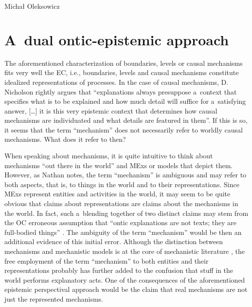 \begin{artengenv}{Michał Oleksowicz}
\section{A~dual ontic-epistemic approach }
The aforementioned characterization of boundaries, levels or causal mechanisms fits very well the EC, i.e., boundaries, levels and causal mechanisms constitute idealized representations of processes. In the case of causal mechanisms, D. Nicholson
\parencite*[][p.160]{nicholson_concept_2012} %
 rightly argues that ``explanations always presuppose a~context that specifies what is to be explained and how much detail will suffice for a~satisfying answer, […] it is this very epistemic context that determines how causal mechanisms are individuated and what details are featured in them''. If this is so, it seems that the term ``mechanism'' does not necessarily refer to worldly causal mechanisms. What does it refer to then?

When speaking about mechanisms, it is quite intuitive to think about mechanisms ``out there in the world'' and MExs or models that depict them. However, as Nathan
\parencite[][pp.171–172]{nathan_black_2021} %
 notes, the term ``mechanism'' is ambiguous and may refer to both aspects, that is, to things in the world and to their representations. Since MExs represent entities and activities in the world, it may seem to be quite obvious that claims about representations are claims about the mechanisms in the world. In fact, such a~blending together of two distinct claims may stem from the OC erroneous assumption that ``ontic explanations are not texts; they are full-bodied things'' 
\parencite[][p.40]{kaiser_ontic_2014}. %
 The ambiguity of the term ``mechanism'' would be then an additional evidence of this initial error. Although the distinction between mechanisms and mechanistic models is at the core of mechanistic literature 
\parencite[][]{glennan_modeling_2005}, %
 the free employment of the term ``mechanism'' to both entities and their representations probably has further added to the confusion that stuff in the world performs explanatory acts. One of the consequences of the aforementioned epistemic perspectival approach would be the claim that real mechanisms are not just the represented mechanisms.


\end{artengenv}
